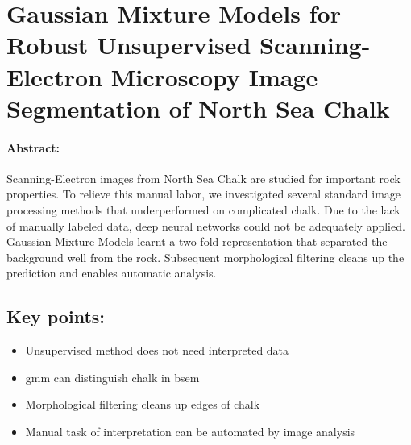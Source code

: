 \section[Gaussian Mixture Models for Robust Unsupervised Scanning-Electron Microscopy Image Segmentation of North Sea Chalk]{Gaussian Mixture Models for Robust Unsupervised Scanning-Electron Microscopy Image Segmentation of North Sea Chalk}
\label{section:gaussian}

\paragraph{Abstract:} Scanning-Electron images from North Sea Chalk are studied for important rock properties. To relieve this manual labor, we investigated several standard image processing methods that underperformed on complicated chalk. Due to the lack of manually labeled data, deep neural networks could not be adequately applied. Gaussian Mixture Models learnt a two-fold representation that separated the background well from the rock. Subsequent morphological filtering cleans up the prediction and enables automatic analysis. 

\subsection*{Key points:}
\begin{itemize}
    \item Unsupervised method does not need interpreted data
    \item \acf{gmm} can distinguish chalk in \acf{bsem}
    \item Morphological filtering cleans up edges of chalk
    \item Manual task of interpretation can be automated by image analysis
\end{itemize}

{\vfill\hfill\newline{}}


